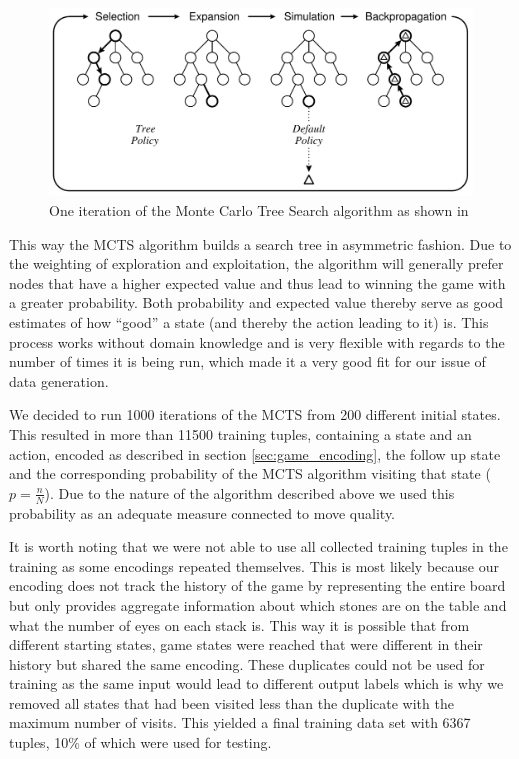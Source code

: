\documentclass[12pt,a4paper]{article}
\begin{document}
{\begin{figure}
  \includegraphics[width=\linewidth]{img/mcts.png}
  \centering 
  \caption{ One iteration of the Monte Carlo Tree Search algorithm as shown in \citet{browne_survey_2012}}
  \label{fig:mcts}
\end{figure}

This way the MCTS algorithm builds a search tree in asymmetric fashion. Due to the weighting of exploration and exploitation, the algorithm will generally prefer nodes that have a higher expected value and thus lead to winning the game with a greater probability. Both probability and expected value thereby serve as good estimates of how “good” a state (and thereby the action leading to it) is. This process works without domain knowledge and is very flexible with regards to the number of times it is being run, which made it a very good fit for our issue of data generation.

We decided to run 1000 iterations of the MCTS from 200 different initial states. This resulted in more than 11500 training tuples, containing a state and an action, encoded as described in section \ref{sec:game_encoding}, the follow up state and the corresponding probability of the MCTS algorithm visiting that state ($p = \frac{n}{N}$). Due to the nature of the algorithm described above we used this probability as an adequate measure connected to move quality.

It is worth noting that we were not able to use all collected training tuples in the training as some encodings repeated themselves. This is most likely because our encoding does not track the history of the game by representing the entire board but only provides aggregate information about which stones are on the table and what the number of eyes on each stack is. This way it is possible that from different starting states, game states were reached that were different in their history but shared the same encoding. These duplicates could not be used for training as the same input would lead to different output labels which is why we removed all states that had been visited less than the duplicate with the maximum number of visits. This yielded a final training data set with 6367 tuples, 10\% of which were used for testing.

}
\end{document}
